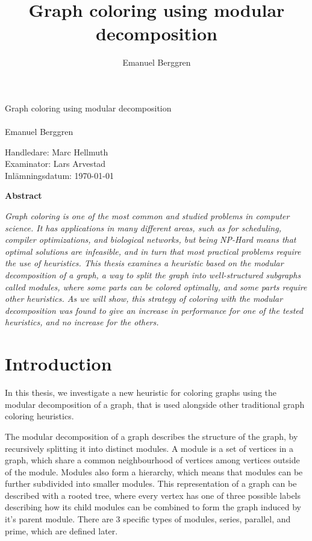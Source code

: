 \documentclass[a4paper]{article}
\author{Emanuel Berggren}
\title{Graph coloring using modular decomposition}
\newcommand{\Framsida}{\AddToShipoutPicture*{\put(0,0){\texttt{[image: kandidatfram.pdf]}}}}
\begin{document}
\sloppy
\Framsida 
\vspace*{4cm}
\Huge{Graph coloring using modular decomposition}\\\\ %
\Large{Emanuel Berggren} %

\vspace*{12cm}
\Large{Handledare: Marc Hellmuth} \\ 
\Large{Examinator: Lars Arvestad} \\ 
\Large{Inlämningsdatum: \today}\\

\begin{center}
	\textbf{Abstract}
\end{center}
\textit{
Graph coloring is one of the most common and studied problems in computer
science. It has applications in many different areas, such as for scheduling,
compiler optimizations, and biological networks, but
being NP-Hard means that optimal solutions are infeasible, and in turn that most
practical problems require the use of heuristics. This thesis examines a
heuristic based on the modular decomposition of a graph, a way to split the graph
into well-structured subgraphs called modules, where some parts can be colored optimally,
and some parts require other heuristics. As we will show, this strategy of coloring with the
modular decomposition was found to give an increase in performance for one
of the tested heuristics, and no increase for the others.
}




\tableofcontents


\section{Introduction}


In this thesis, we investigate a new heuristic for coloring graphs using the
modular decomposition of a graph, that is used alongside other traditional
graph coloring heuristics.

The modular decomposition of a graph describes the structure of the graph, by
recursively splitting it into distinct modules. A module is a set of vertices
in a graph, which share a common neighbourhood of vertices among vertices
outside of the module. Modules also form a hierarchy, which means that modules
can be further subdivided into smaller modules. This representation of a graph
can be described with a rooted tree, where every vertex has one of three
possible labels describing how its child modules can be combined to form the
graph induced by it's parent module. There are 3 specific types of modules,
series, parallel, and prime, which are defined later.
\end{document}
